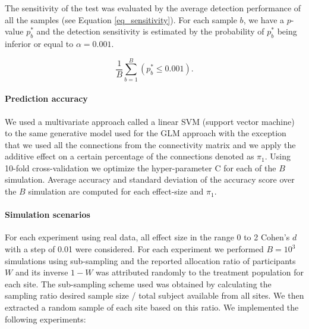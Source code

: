 \documentclass[authoryear]{elsarticle}
\begin{document}
The sensitivity of the test was evaluated by the average detection performance of all the samples (see Equation \ref{eq_sensitivity}). For each sample $b$, we have a $p$-value $p^{*}_b$ and the detection sensitivity is estimated by the probability of $p^{*}_b$ being inferior or equal to $\alpha=0.001$.

\begin{equation}
   \frac{1}{B}\sum\limits_{b=1}^B\left(p^{*}_b\leq0.001\right).
   \label{eq_sensitivity}
\end{equation}


\paragraph{Prediction accuracy}
We used a multivariate approach called a linear SVM (support vector machine) \citep{Cortes1995} to the same generative model used for the GLM approach with the exception that we used all the connections from the connectivity matrix and we apply the additive effect on a certain percentage of the connections denoted as $\pi_1$. Using 10-fold cross-validation we optimize the hyper-parameter C for each of the $B$ simulation. Average accuracy and standard deviation of the accuracy score over the $B$ simulation are computed for each effect-size and $\pi_1$.

\paragraph{Simulation scenarios}
For each experiment using real data, all effect size in the range 0 to 2 Cohen’s $d$ with a step of 0.01 were considered. For each experiment we performed $B=10^3$ simulations using sub-sampling and the reported allocation ratio of participants $W$ and its inverse $1-W$ was attributed randomly to the treatment population for each site. The sub-sampling scheme used was obtained by calculating the sampling ratio desired sample size / total subject available from all sites. We then extracted a random sample of each site based on this ratio. We implemented the following experiments:
\end{document}
